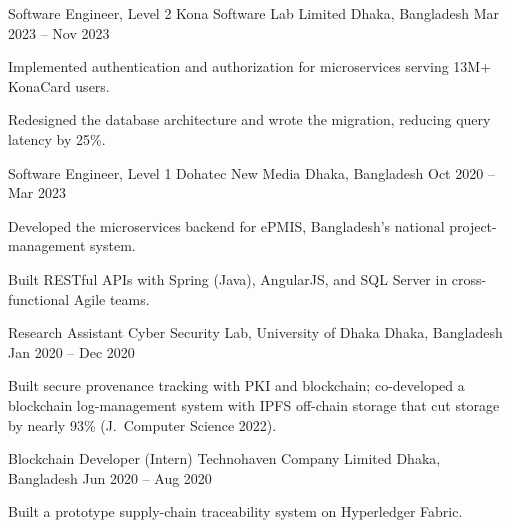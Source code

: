 \documentclass{academic-cv}
\makeatletter
\let\section\cv@origsection
\makeatother
\begin{document}
\resentry
    {Software Engineer, Level 2}
    {Kona Software Lab Limited}
    {Dhaka, Bangladesh}
    {Mar 2023 -- Nov 2023}
\begin{resbullets}
    \item Implemented authentication and authorization for microservices serving 13M+ KonaCard users.
    \item Redesigned the database architecture and wrote the migration, reducing query latency by 25\%.
\end{resbullets}

\resentry
    {Software Engineer, Level 1}
    {Dohatec New Media}
    {Dhaka, Bangladesh}
    {Oct 2020 -- Mar 2023}
\begin{resbullets}
    \item Developed the microservices backend for ePMIS, Bangladesh's national project-management system.
    \item Built RESTful APIs with Spring (Java), AngularJS, and SQL Server in cross-functional Agile teams.
\end{resbullets}

\resentry
    {Research Assistant}
    {Cyber Security Lab, University of Dhaka}
    {Dhaka, Bangladesh}
    {Jan 2020 -- Dec 2020}
\begin{resbullets}
    \item Built secure provenance tracking with PKI and blockchain; co-developed a blockchain log-management system with IPFS off-chain storage that cut storage by nearly 93\% (J.\ Computer Science 2022).
\end{resbullets}

\resentry
    {Blockchain Developer (Intern)}
    {Technohaven Company Limited}
    {Dhaka, Bangladesh}
    {Jun 2020 -- Aug 2020}
\begin{resbullets}
    \item Built a prototype supply-chain traceability system on Hyperledger Fabric.
\end{resbullets}

\section{Publications}
\begingroup
\usecompactpublications

\endgroup

\end{document}
